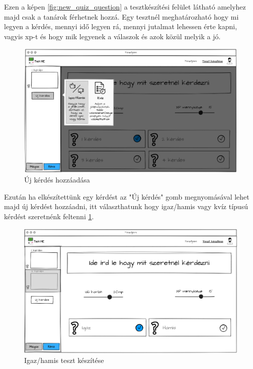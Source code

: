 Ezen a képen \ref{fig:new_quiz_question} a tesztkészítési felület látható amelyhez majd csak a tanárok férhetnek hozzá. Egy tesztnél meghatározható hogy mi legyen a kérdés, mennyi idő legyen rá, mennyi jutalmat lehessen érte kapni, vagyis xp-t és hogy mik legyenek a válaszok és azok közül melyik a jó.


\begin{figure}[H]
    \centering
    \includegraphics[width=\linewidth]{images/make_test2_wireframe.png}
    \caption{Új kérdés hozzáadása}
    \label{fig:new_question}
\end{figure}

Ezután ha elkészítettünk egy kérdést az "Új kérdés" gomb megnyomásával lehet majd új kérdést hozzáadni, itt választhatunk hogy igaz/hamis vagy kvíz típusú kérdést szeretnénk feltenni \ref{fig:new_question}.

\begin{figure}[H]
    \centering
    \includegraphics[width=\linewidth]{images/make_test3_wireframe.png}
    \caption{Igaz/hamis teszt készítése}
    \label{fig:test_true_false}
\end{figure}


